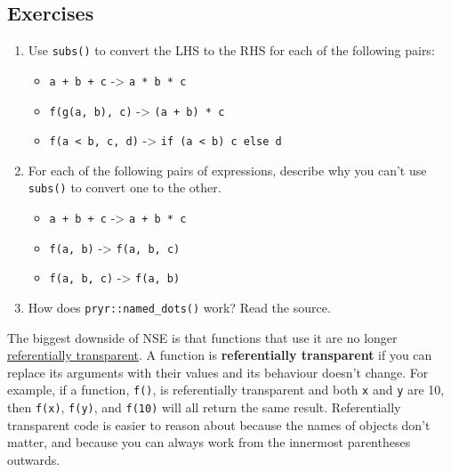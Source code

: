 \subsection{Exercises}

\begin{enumerate}
\def\labelenumi{\arabic{enumi}.}
\itemsep1pt\parskip0pt
\item
  Use \texttt{subs()} to convert the LHS to the RHS for each of the
  following pairs:

  \begin{itemize}
  \itemsep1pt\parskip0pt
  \item
    \texttt{a + b + c} -\textgreater{} \texttt{a * b * c}
  \item
    \texttt{f(g(a, b), c)} -\textgreater{} \texttt{(a + b) * c}
  \item
    \texttt{f(a \textless{} b, c, d)} -\textgreater{}
    \texttt{if (a \textless{} b) c else d}
  \end{itemize}
\item
  For each of the following pairs of expressions, describe why you can't
  use \texttt{subs()} to convert one to the other.

  \begin{itemize}
  \itemsep1pt\parskip0pt
  \item
    \texttt{a + b + c} -\textgreater{} \texttt{a + b * c}
  \item
    \texttt{f(a, b)} -\textgreater{} \texttt{f(a, b, c)}
  \item
    \texttt{f(a, b, c)} -\textgreater{} \texttt{f(a, b)}
  \end{itemize}
\item
  How does \texttt{pryr::named\_dots()} work? Read the source.
\end{enumerate}


The biggest downside of NSE is that functions that use it are no longer
\href{http://en.wikipedia.org/wiki/Referential_transparency_(computer_science)}{referentially
transparent}. A function is \textbf{referentially transparent} if you
can replace its arguments with their values and its behaviour doesn't
change. For example, if a function, \texttt{f()}, is referentially
transparent and both \texttt{x} and \texttt{y} are 10, then
\texttt{f(x)}, \texttt{f(y)}, and \texttt{f(10)} will all return the
same result. Referentially transparent code is easier to reason about
because the names of objects don't matter, and because you can always
work from the innermost parentheses outwards.

